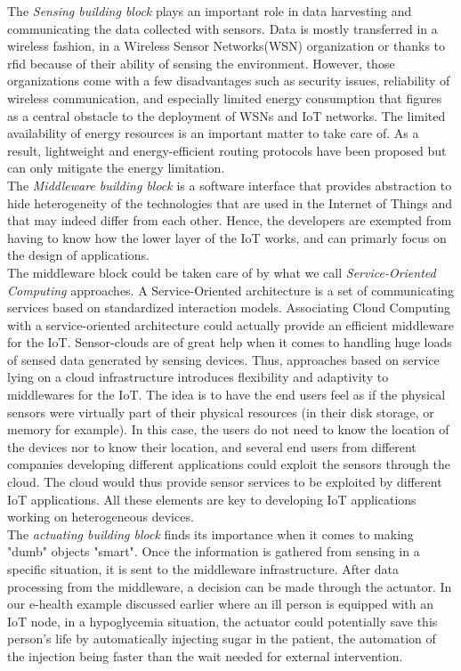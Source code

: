 The \textit{Sensing building block} plays an important role in data harvesting and communicating the data collected with sensors. Data is mostly transferred in a wireless fashion, in a Wireless Sensor Networks(WSN) organization or thanks to \acrfull{rfid} because of their ability of sensing the environment. However, those organizations come with a few disadvantages such as security issues, reliability of wireless communication, and especially limited energy consumption that figures as a central obstacle to the deployment of WSNs and IoT networks. The limited availability of energy resources is an important matter to take care of. As a result, lightweight and energy-efficient routing protocols have been proposed but can only mitigate the energy limitation. \\

The \textit{Middleware building block} is a software interface that provides abstraction to hide heterogeneity of the technologies that are used in the Internet of Things and that may indeed differ from each other. Hence, the developers are exempted from having to know how the lower layer of the IoT works, and can primarly focus on the design of applications. \\

The middleware block could be taken care of by what we call \textit{Service-Oriented Computing} approaches. A Service-Oriented architecture is a set of communicating services based on standardized interaction models. Associating Cloud Computing with a service-oriented architecture could actually provide an efficient middleware for the IoT. Sensor-clouds are of great help when it comes to handling huge loads of sensed data generated by sensing devices. Thus, approaches based on service lying on a cloud infrastructure introduces flexibility and adaptivity to middlewares for the IoT. The idea is to have the end users feel as if the physical sensors were virtually part of their physical resources (in their disk storage, or memory for example). In this case, the users do not need to know the location of the devices nor to know their location, and several end users from different companies developing different applications could exploit the sensors through the cloud. The cloud would thus provide sensor services to be exploited by different IoT applications. All these elements are key to developing IoT applications working on heterogeneous devices. \\

The \textit{actuating building block} finds its importance when it comes to making "dumb" objects "smart". Once the information is gathered from sensing in a specific situation, it is sent to the middleware infrastructure. After data processing from the middleware, a decision can be made through the actuator. In our e-health example discussed earlier where an ill person is equipped with an IoT node, in a hypoglycemia situation, the actuator could potentially save this person's life by automatically injecting sugar in the patient, the automation of the injection being faster than the wait needed for external intervention. \\

